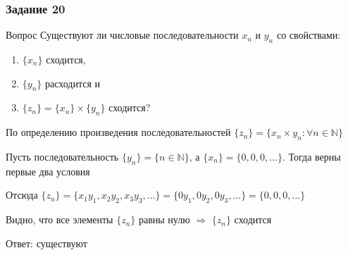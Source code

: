 \documentclass[8pt]{beamer}
\begin{document}
  \begin{frame}
    \frametitle{Задание 20}

    \begin{block}{Вопрос}
      Существуют ли числовые последовательности $x_n$ и $y_n$ со свойствами:
      \begin{enumerate}
        \item $\{x_n\}$ сходится,
        \item $\{y_n\}$ расходится и
        \item $\{z_n\} = \{x_n\} \times \{y_n\}$ сходится?
      \end{enumerate}
    \end{block}

    По определению произведения последовательностей $\{z_n\} = \{x_n \times y_n: \forall n \in \mathbb{N}\}$

    Пусть последовательность $\{y_n\} = \{n \in \mathbb{N}\}$, а $\{x_n\} = \{0, 0, 0, \dots\}$. Тогда верны первые два условия
  
    Отсюда $\{z_n\} = \{x_1y_1, x_2y_2, x_3y_3, \dots\} = \{0y_1, 0y_2, 0y_3, \dots\} = \{0, 0, 0, \dots\}$

    Видно, что все элементы $\{z_n\}$ равны нулю $\Rightarrow$ $\{z_n\}$ сходится

    \begin{flushright}
      Ответ: существуют
    \end{flushright}
  \end{frame}
\end{document}
